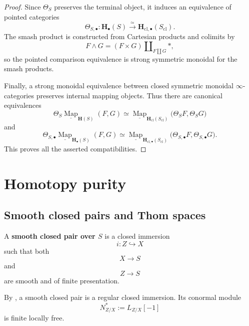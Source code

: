 \begin{proof}
Since \(\Theta_S\) preserves the terminal object, it induces an
equivalence of pointed categories
\[
    \Theta_{S,\bullet}
    \colon
    \mathbf H_\bullet(S)
    \xrightarrow{\simeq}
    \mathbf H_{\mathrm{cl},\bullet}(S_{\mathrm{cl}}).
\]
The smash product is constructed from Cartesian products and colimits
by
\[
    F\wedge G
    =
    (F\times G)
    \amalg_{F\amalg G}
    *,
\]
so the pointed comparison equivalence is strong symmetric monoidal for
the smash products.

Finally, a strong monoidal equivalence between closed symmetric
monoidal \(\infty\)-categories preserves internal mapping objects.
Thus there are canonical equivalences
\[
    \Theta_S
    \underline{\operatorname{Map}}_{\mathbf H(S)}
    (F,G)
    \simeq
    \underline{\operatorname{Map}}_{
        \mathbf H_{\mathrm{cl}}(S_{\mathrm{cl}})
    }
    \bigl(
        \Theta_SF,
        \Theta_SG
    \bigr)
\]
and
\[
    \Theta_{S,\bullet}
    \underline{\operatorname{Map}}_{\mathbf H_\bullet(S)}
    (F,G)
    \simeq
    \underline{\operatorname{Map}}_{
        \mathbf H_{\mathrm{cl},\bullet}(S_{\mathrm{cl}})
    }
    \bigl(
        \Theta_{S,\bullet}F,
        \Theta_{S,\bullet}G
    \bigr).
\]
This proves all the asserted compatibilities.
\end{proof}

\section{Homotopy purity}
\label{sec:brave-new-homotopy-purity}

\subsection{Smooth closed pairs and Thom spaces}

\begin{definition}
\label{def:smooth-closed-pair}
A \textbf{smooth closed pair over \(S\)} is a closed immersion
\[
    i
    \colon
    Z
    \hookrightarrow
    X
\]
such that both
\[
    X
    \longrightarrow
    S
\]
and
\[
    Z
    \longrightarrow
    S
\]
are smooth and of finite presentation.
\end{definition}

By , a smooth closed pair is a
regular closed immersion.  Its conormal module
\[
    N^*_{Z/X}
    :=
    L_{Z/X}[-1]
\]
is finite locally free.

